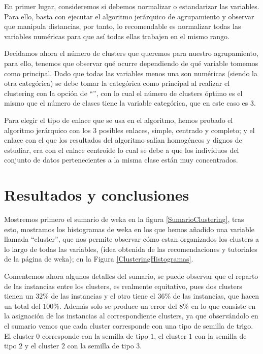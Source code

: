 \documentclass[a4paper, 11pt, twoside, openany, onecolumn, final]{memoir}
\begin{document}
	En primer lugar, consideremos si debemos normalizar o estandarizar las variables. Para ello, basta con ejecutar el algoritmo jerárquico de agrupamiento y observar que manipula distancias, por tanto, lo recomendable es normalizar todas las variables numéricas para que así todas ellas trabajen en el mismo rango.  
	
	Decidamos ahora el número de clusters que queremos para nuestro agrupamiento, para ello, tenemos que observar qué ocurre dependiendo de qué variable tomemos como principal. Dado que todas las variables menos una son numéricas (siendo la otra categórica) se debe tomar la categórica como principal al realizar el clustering con la opción de ``'', con lo cual el número de clusters óptimo es el mismo que el número de clases tiene la variable categórica, que en este caso es $3$.
	
	Para elegir el tipo de enlace que se usa en el algoritmo, hemos probado el algoritmo jerárquico con los $3$ posibles enlaces, simple, centrado y completo; y el enlace con el que los resultados del algoritmo salían homogéneos y dignos de estudiar, era con el enlace centroide lo cual se debe a que los individuos del conjunto de datos pertenecientes a la misma clase están muy concentrados.
	
	\section{Resultados y conclusiones}
	Mostremos primero el sumario de weka en la figura \ref{SumarioClustering}, tras esto, mostramos los histogramas de weka en los que hemos añadido una variable llamada ``cluster'', que nos permite observar cómo estan organizados los clusters a lo largo de todas las variables, (idea obtenida de las recomendaciones y tutoriales de la página de weka); en la Figura \ref{ClusteringHistogramas}.

Comentemos ahora algunos detalles del sumario, se puede observar que el reparto de las instancias entre los clusters, es realmente equitativo, pues dos clusters tienen un $32\%$ de las instancias y el otro tiene el $36\%$ de las instancias, que hacen un total del $100\%$. Además solo se produce un error del $8\%$ en lo que consiste en la asignación de las instancias al correspondiente clusters, ya que observándolo en el sumario vemos que cada cluster corresponde con una tipo de semilla de trigo. El cluster $0$ corresponde con la semilla de tipo $1$, el cluster $1$ con la semilla de tipo $2$ y el cluster $2$ con la semilla de tipo $3$.
\end{document}
